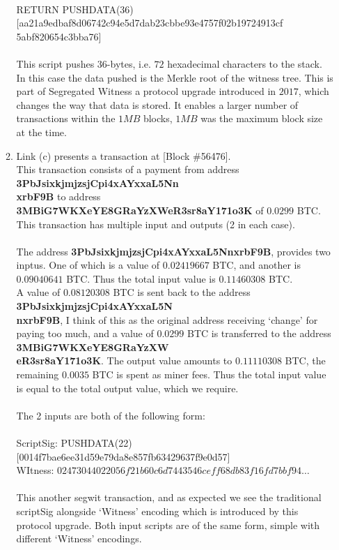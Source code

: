 \documentclass[12pt, a4paper]{article}
\begin{document}
\begin{enumerate}
\begin{enumerate}
\\
RETURN PUSHDATA(36)[aa21a9edbaf8d06742c94e5d7dab23cbbe93e4757f02b19724913cf\\5abf820654c3bba76]\\
\\
This script pushes $36$-bytes, i.e. $72$ hexadecimal characters to the stack. In this case the data pushed is the Merkle root of the witness tree. This is part of Segregated Witness a protocol upgrade introduced in $2017$, which changes the way that data is stored. It enables a larger number of transactions within the $1MB$ blocks, $1MB$ was the maximum block size at the time.
\item Link (c) presents a transaction at [Block \#56476].\\
This transaction consists of a payment from address \textbf{3PbJsixkjmjzsjCpi4xAYxxaL5Nn\\xrbF9B} to address \textbf{3MBiG7WKXeYE8GRaYzXWeR3sr8aY171o3K} of $0.0299$ BTC. This transaction has multiple input and outputs (2 in each case). \\
\\
The address \textbf{3PbJsixkjmjzsjCpi4xAYxxaL5NnxrbF9B}, provides two inptus. One of which is a value of $0.02419667$ BTC, and another is $0.09040641$ BTC. Thus the total input value is $0.11460308$ BTC.\\
A value of $0.08120308$ BTC is sent back to the address \textbf{3PbJsixkjmjzsjCpi4xAYxxaL5N\\nxrbF9B}, I think of this as the original address receiving `change' for paying too much, and a value of $0.0299$ BTC is transferred to the address \textbf{3MBiG7WKXeYE8GRaYzXW\\eR3sr8aY171o3K}. The output value amounts to $0.11110308$ BTC, the remaining $0.0035$ BTC is spent as miner fees. Thus the total input value is equal to the total output value, which we require.\\
\\
The 2 inputs are both of the following form:\\
\\
\phantom{ab} ScriptSig: PUSHDATA(22)[0014f7bae6ee31d59e79da8e857fb63429637f9e0d57]\\
\phantom{ab} WItness: $02473044022056f21b60c6d7443546ceff68db83f16fd7bbf94\dots$\\
\\
This another segwit transaction, and as expected we see the traditional scriptSig alongside `Witness' encoding which is introduced by this protocol upgrade. Both input scripts are of the same form, simple with different `Witness' encodings.\\

\end{enumerate}
\end{enumerate}
\end{document}
